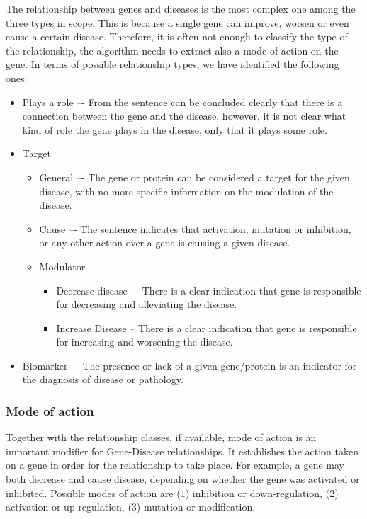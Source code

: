 \documentclass[final,12pt,3p,times,twocolumn,authoryear]{elsarticle}
\begin{document}
The relationship between genes and diseases is the most complex one among the three types in scope. This is because a single gene can improve, worsen or even cause a certain disease. Therefore, it is often not enough to classify the type of the relationship, the algorithm needs to extract also a mode of action on the gene. In terms of possible relationship types, we have identified the following ones: 
\begin{itemize}
	\item Plays a role –- From the sentence can be concluded clearly that there is a connection between the gene and the disease, however, it is not clear what kind of role the gene plays in the disease, only that it plays some role. 
	\item Target
	\begin{itemize}
		\item General –- The gene or protein can be considered a target for the given disease, with no more specific information on the modulation of the disease.
		\item Cause –- The sentence indicates that activation, mutation or inhibition, or any other action over a gene is causing a given disease.
	\item Modulator
	\begin{itemize}
	\item Decrease disease -– There is a clear indication that gene is responsible for decreasing and alleviating the disease. 
	\item Increase Disease -- There is a clear indication that gene is responsible for increasing and worsening the disease.
	\end{itemize}	
	\end{itemize}

	\item 	Biomarker –- The presence or lack of a given gene/protein is an indicator for the diagnosis of disease or pathology.
 

\end{itemize}

\subsubsection{Mode of action}

Together with the relationship classes, if available, mode of action is an important modifier for Gene-Disease relationships. It establishes the action taken on a gene in order for the relationship to take place. For example, a gene may both decrease and cause disease, depending on whether the gene was activated or inhibited. Possible modes of action are (1) inhibition or down-regulation, (2) activation or up-regulation, (3) mutation or modification. 
\end{document}
